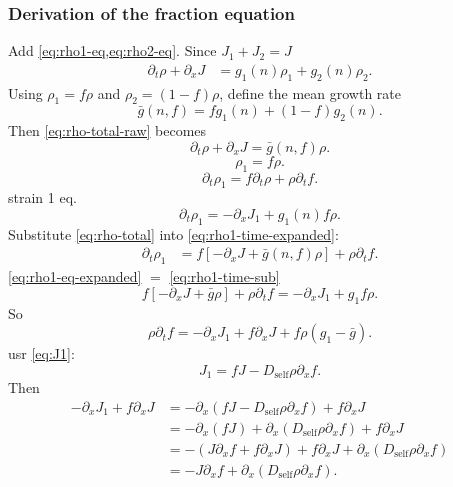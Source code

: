 \documentclass[11pt,a4paper]{report}
\newcommand{\Dself}{D_{\mathrm{self}}}
\newcommand{\pd}{\partial}
\begin{document}
	\subsubsection{Derivation of the fraction equation}
	Add \cref{eq:rho1-eq,eq:rho2-eq}. Since \(J_1+J_2=J\)
	\begin{align}
		\pd_t\rho+\pd_xJ
		&=g_1(n)\rho_1+g_2(n)\rho_2.
		\label{eq:rho-total-raw}
	\end{align}
	Using \(\rho_1=f\rho\) and \(\rho_2=(1-f)\rho\), define the mean growth rate
	\begin{equation}
		\bar g(n,f)=fg_1(n)+(1-f)g_2(n).
		\label{eq:gbar}
	\end{equation}
	Then \cref{eq:rho-total-raw} becomes
	\begin{equation}
		\pd_t\rho+\pd_xJ=\bar g(n,f)\rho.
		\label{eq:rho-total}
	\end{equation}
	\begin{equation}
		\rho_1=f\rho.
	\end{equation}
	\begin{equation}
		\pd_t\rho_1=f\pd_t\rho+\rho\pd_t f.
		\label{eq:rho1-time-expanded}
	\end{equation}
	strain 1 eq.
	\begin{equation}
		\pd_t\rho_1=-\pd_xJ_1+g_1(n)f\rho.
		\label{eq:rho1-eq-expanded}
	\end{equation}
	Substitute \cref{eq:rho-total} into \cref{eq:rho1-time-expanded}:
	\begin{align}
		\pd_t\rho_1
		&=f[-\pd_xJ+\bar g(n,f)\rho]+\rho\pd_t f.
		\label{eq:rho1-time-sub}
	\end{align}
	\cref{eq:rho1-eq-expanded} $=$ \cref{eq:rho1-time-sub}
	\begin{equation}
		f[-\pd_xJ+\bar g\rho]+\rho\pd_t f
		=-\pd_xJ_1+g_1f\rho.
	\end{equation}
	So
	\begin{equation}
		\rho\pd_t f=-\pd_xJ_1+f\pd_xJ+f\rho(g_1-\bar g).
		\label{eq:f-preflux}
	\end{equation}
	usr \cref{eq:J1}:
	\begin{equation}
		J_1=fJ-\Dself\rho\pd_xf.
	\end{equation}
	Then
	\begin{align}
		-\pd_xJ_1+f\pd_xJ
		&=-\pd_x\left(fJ-\Dself\rho\pd_xf\right)+f\pd_xJ\nonumber\\
		&=-\pd_x(fJ)+\pd_x(\Dself\rho\pd_xf)+f\pd_xJ\nonumber\\
		&=-(J\pd_xf+f\pd_xJ)+f\pd_xJ+
		\pd_x(\Dself\rho\pd_xf)\nonumber\\
		&=-J\pd_xf+\pd_x(\Dself\rho\pd_xf).
		\label{eq:flux-algebra}
	\end{align}
\end{document}
